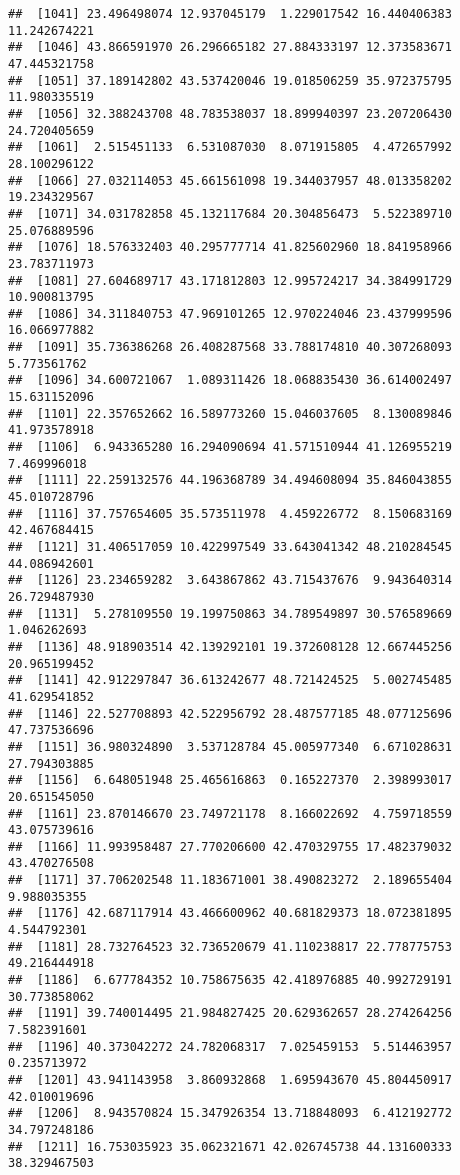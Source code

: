 \documentclass[
]{article}
\begin{document}
\begin{verbatim}
##  [1041] 23.496498074 12.937045179  1.229017542 16.440406383 11.242674221
##  [1046] 43.866591970 26.296665182 27.884333197 12.373583671 47.445321758
##  [1051] 37.189142802 43.537420046 19.018506259 35.972375795 11.980335519
##  [1056] 32.388243708 48.783538037 18.899940397 23.207206430 24.720405659
##  [1061]  2.515451133  6.531087030  8.071915805  4.472657992 28.100296122
##  [1066] 27.032114053 45.661561098 19.344037957 48.013358202 19.234329567
##  [1071] 34.031782858 45.132117684 20.304856473  5.522389710 25.076889596
##  [1076] 18.576332403 40.295777714 41.825602960 18.841958966 23.783711973
##  [1081] 27.604689717 43.171812803 12.995724217 34.384991729 10.900813795
##  [1086] 34.311840753 47.969101265 12.970224046 23.437999596 16.066977882
##  [1091] 35.736386268 26.408287568 33.788174810 40.307268093  5.773561762
##  [1096] 34.600721067  1.089311426 18.068835430 36.614002497 15.631152096
##  [1101] 22.357652662 16.589773260 15.046037605  8.130089846 41.973578918
##  [1106]  6.943365280 16.294090694 41.571510944 41.126955219  7.469996018
##  [1111] 22.259132576 44.196368789 34.494608094 35.846043855 45.010728796
##  [1116] 37.757654605 35.573511978  4.459226772  8.150683169 42.467684415
##  [1121] 31.406517059 10.422997549 33.643041342 48.210284545 44.086942601
##  [1126] 23.234659282  3.643867862 43.715437676  9.943640314 26.729487930
##  [1131]  5.278109550 19.199750863 34.789549897 30.576589669  1.046262693
##  [1136] 48.918903514 42.139292101 19.372608128 12.667445256 20.965199452
##  [1141] 42.912297847 36.613242677 48.721424525  5.002745485 41.629541852
##  [1146] 22.527708893 42.522956792 28.487577185 48.077125696 47.737536696
##  [1151] 36.980324890  3.537128784 45.005977340  6.671028631 27.794303885
##  [1156]  6.648051948 25.465616863  0.165227370  2.398993017 20.651545050
##  [1161] 23.870146670 23.749721178  8.166022692  4.759718559 43.075739616
##  [1166] 11.993958487 27.770206600 42.470329755 17.482379032 43.470276508
##  [1171] 37.706202548 11.183671001 38.490823272  2.189655404  9.988035355
##  [1176] 42.687117914 43.466600962 40.681829373 18.072381895  4.544792301
##  [1181] 28.732764523 32.736520679 41.110238817 22.778775753 49.216444918
##  [1186]  6.677784352 10.758675635 42.418976885 40.992729191 30.773858062
##  [1191] 39.740014495 21.984827425 20.629362657 28.274264256  7.582391601
##  [1196] 40.373042272 24.782068317  7.025459153  5.514463957  0.235713972
##  [1201] 43.941143958  3.860932868  1.695943670 45.804450917 42.010019696
##  [1206]  8.943570824 15.347926354 13.718848093  6.412192772 34.797248186
##  [1211] 16.753035923 35.062321671 42.026745738 44.131600333 38.329467503

\end{verbatim}
\end{document}
